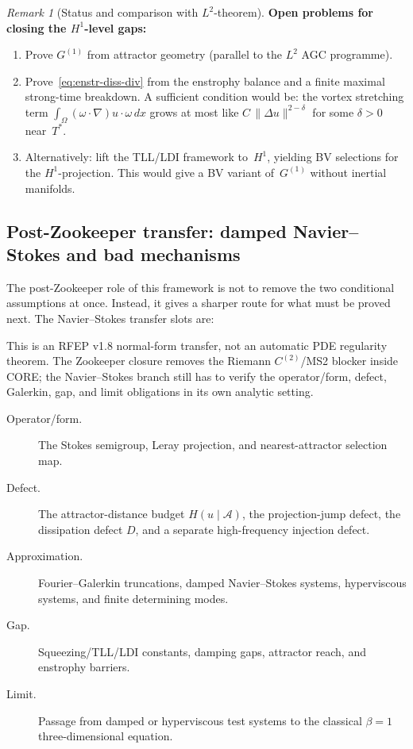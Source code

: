 \documentclass[12pt,a4paper]{article}
\theoremstyle{definition}
\theoremstyle{plain}
\theoremstyle{remark}
\newtheorem{remark}[definition]{Remark}
\begin{document}
\begin{remark}[Status and comparison with $L^2$-theorem]
\medskip\noindent
\textbf{Open problems for closing the $H^1$-level gaps:}
\begin{enumerate}
  \item Prove $G^{(1)}$ from attractor geometry (parallel to the
    $L^2$ AGC programme).
  \item Prove~\eqref{eq:enstr-diss-div} from the enstrophy balance
    and a finite maximal strong-time breakdown.  A sufficient condition would be: the vortex
    stretching term $\int_\Omega(\omega\cdot\nabla)u\cdot\omega\,dx$
    grows at most like $C\,\|\Delta u\|^{2-\delta}$ for some
    $\delta > 0$ near~$T^*$.
  \item Alternatively: lift the TLL/LDI framework to~$H^1$,
    yielding BV selections for the $H^1$-projection.  This would
    give a BV variant of~$G^{(1)}$ without inertial manifolds.
\end{enumerate}
\end{remark}


\subsection{Post-Zookeeper transfer: damped Navier--Stokes and bad mechanisms}
\label{subsec:zookeeper-ns-transfer}

The post-Zookeeper role of this framework is not to remove the two
conditional assumptions at once.  Instead, it gives a sharper route for
what must be proved next.  The Navier--Stokes transfer slots are:

This is an RFEP v1.8 normal-form transfer, not an automatic PDE
regularity theorem.  The Zookeeper closure removes the Riemann
$C^{(2)}$/MS2 blocker inside CORE; the Navier--Stokes branch still has to
verify the operator/form, defect, Galerkin, gap, and limit obligations in
its own analytic setting.
\begin{description}
  \item[Operator/form.] The Stokes semigroup, Leray projection, and
  nearest-attractor selection map.
  \item[Defect.] The attractor-distance budget $H(u\mid\mathcal{A})$,
  the projection-jump defect, the dissipation defect $D$, and a separate
  high-frequency injection defect.
  \item[Approximation.] Fourier--Galerkin truncations, damped
  Navier--Stokes systems, hyperviscous systems, and finite determining
  modes.
  \item[Gap.] Squeezing/TLL/LDI constants, damping gaps, attractor reach,
  and enstrophy barriers.
  \item[Limit.] Passage from damped or hyperviscous test systems to the
  classical $\beta=1$ three-dimensional equation.
\end{description}
\end{document}
